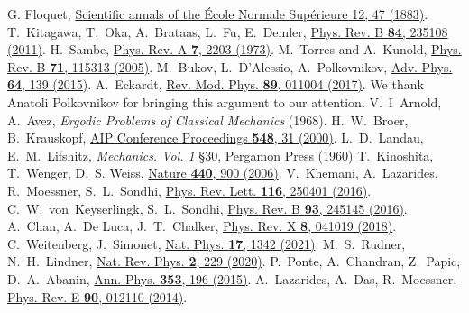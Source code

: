 \documentclass[aps,pre,twocolumn,notitlepage,floats,10pt]{revtex4-1}
\begin{document}
\begin{references}
  G. Floquet,
  \href{https://doi.org/10.24033/asens.220}{Scientific annals of the École Normale
    Supérieure 12, 47 (1883)}.
  T.~Kitagawa, T.~Oka, A.~Brataas, L.~Fu, E.~Demler,
  \href{https://doi.org/10.1103/PhysRevB.84.235108}{Phys. Rev. B {\bf 84}, 235108 (2011)}.
  H.~Sambe,
  \href{https://doi.org/10.1103/PhysRevA.7.2203}{Phys. Rev. A {\bf 7}, 2203 (1973)}.
  M.~Torres and A.~Kunold,
  \href{https://doi.org/10.1103/PhysRevB.71.115313}{Phys. Rev. B {\bf 71}, 115313 (2005)}.
  M.~Bukov, L.~D'Alessio, A.~Polkovnikov,
  \href{https://doi.org/10.1080/00018732.2015.1055918}{Adv. Phys. {\bf 64}, 139 (2015)}.
  A.~Eckardt,
  \href{https://doi.org/10.1103/RevModPhys.89.011004}{Rev. Mod. Phys. {\bf 89}, 011004 (2017)}.
  We thank Anatoli Polkovnikov for bringing this argument to our attention.
  V.~I~Arnold, A.~Avez, \emph{Ergodic Problems of Classical Mechanics} (1968).
  H.~W.~Broer, B.~Krauskopf,
  \href{https://doi.org/10.1063/1.1337757}{AIP Conference Proceedings {\bf 548}, 31 (2000)}.
  L.~D.~Landau, E.~M.~Lifshitz, \emph{Mechanics. Vol. 1} \S 30, Pergamon Press (1960)
  T.~Kinoshita, T.~Wenger, D.~S. Weiss,
  \href{https://doi.org/10.1038/nature04693}{Nature {\bf 440}, 900 (2006)}.
  V.~Khemani, A.~Lazarides, R.~Moessner, S.~L.~Sondhi,
  \href{https://doi.org/10.1103/PhysRevLett.116.250401}{Phys. Rev. Lett. {\bf 116}, 250401 (2016)}.
  C.~W.~von~Keyserlingk, S.~L.~Sondhi,
  \href{https://doi.org/10.1103/PhysRevB.93.245145}{Phys. Rev. B {\bf 93}, 245145 (2016)}.
  A.~Chan, A.~De Luca, J.~T.~Chalker,
  \href{https://doi.org/10.1103/PhysRevX.8.041019}{Phys. Rev. X {\bf 8}, 041019 (2018)}.
  C.~Weitenberg, J.~Simonet,
  \href{https://doi.org/10.1038/s41567-021-01316-x}{Nat. Phys. {\bf 17}, 1342 (2021)}.
  M.~S.~Rudner, N.~H.~Lindner,
  \href{https://doi.org/10.1038/s42254-020-0170-z}{Nat. Rev. Phys. {\bf 2}, 229 (2020)}.
  P.~Ponte, A.~Chandran, Z.~Papic, D.~A.~Abanin,
  \href{https://doi.org/10.1016/j.aop.2014.11.008}{Ann. Phys. {\bf 353}, 196 (2015)}.
  A.~Lazarides, A.~Das, R.~Moessner,
  \href{https://doi.org/10.1103/PhysRevE.90.012110}{Phys. Rev. E {\bf 90}, 012110 (2014)}.

\end{references}
\end{document}
